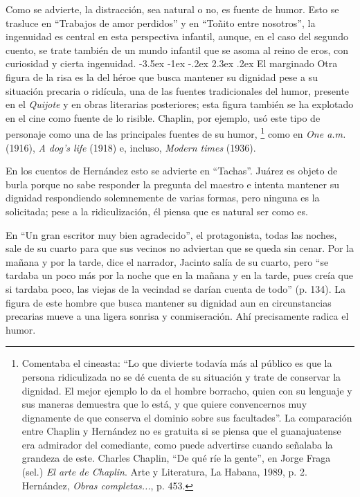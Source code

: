 \documentclass[14pt,twoside,final]{extbook} %
\makeatletter
\let\oldfootnote\footnote
\renewcommand\footnote[1]{%
\oldfootnote{\hspace{1mm}#1}}
\renewcommand\section{\@startsection {section}{1}{\z@}%
                                     {-3.5ex \@plus -1ex \@minus -.2ex}%
                                     {2.3ex \@plus .2ex}%
                                     {\normalfont\large\bfseries\sc}}
\makeatother
\begin{document}
Como se advierte, la distracción, sea natural o no, es fuente de humor. Esto se trasluce en ``Trabajos de amor perdidos'' y en ``Toñito entre nosotros'', la ingenuidad es central en esta perspectiva infantil, aunque, en el caso del segundo cuento, se trate también de un mundo infantil que se asoma al reino de eros, con curiosidad y cierta ingenuidad.
\section{El marginado}\label{sec:el-marginado}
Otra figura de la risa es la del héroe que busca mantener su dignidad pese a su situación precaria o ridícula, una de las fuentes tradicionales del humor, presente en el \emph{Quijote} y en obras literarias posteriores; esta figura también se ha explotado en el cine como fuente de lo risible. Chaplin, por ejemplo, usó este tipo de personaje como una de las principales fuentes de su humor,\footnote{Comentaba el cineasta: ``Lo que divierte todavía más al público es que la persona ridiculizada no se dé cuenta de su situación y trate de conservar la dignidad. El mejor ejemplo lo da el hombre borracho, quien con su lenguaje y sus maneras demuestra que lo está, y que quiere convencernos muy dignamente de que conserva el dominio sobre sus facultades''. La comparación entre Chaplin y Hernández no es gratuita si se piensa que el guanajuatense era admirador del comediante, como puede advertirse cuando señalaba la grandeza de este. Charles Chaplin, ``De qué ríe la gente'', en Jorge Fraga (sel.) \emph{El arte de Chaplin}. Arte y Literatura, La Habana, 1989, p. 2. Hernández, \emph{Obras completas...}, p. 453.} como en \emph{One a.m.} (1916), \emph{A dog's life} (1918) e, incluso, \emph{Modern times} (1936).

En los cuentos de Hernández esto se advierte en ``Tachas''. Juárez es objeto de burla porque no sabe responder la pregunta del maestro e intenta mantener su dignidad respondiendo solemnemente de varias formas, pero ninguna es la solicitada; pese a la ridiculización, él piensa que es natural ser como es.

En ``Un gran escritor muy bien agradecido'', el protagonista, todas las noches, sale de su cuarto para que sus vecinos no adviertan que se queda sin cenar. Por la mañana y por la tarde, dice el narrador, Jacinto salía de su cuarto, pero ``se tardaba un poco más por la noche que en la mañana y en la tarde, pues creía que si tardaba poco, las viejas de la vecindad se darían cuenta de todo'' (p. 134). La figura de este hombre que busca mantener su dignidad aun en circunstancias precarias mueve a una ligera sonrisa y conmiseración. Ahí precisamente radica el humor.
\end{document}
